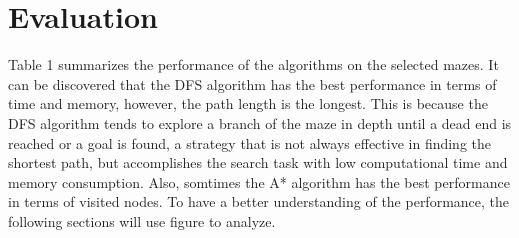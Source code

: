 \documentclass{article}
\begin{document}
\section{Evaluation}
Table 1 summarizes the performance of the algorithms on the selected mazes. 
It can be discovered that the DFS algorithm has the best performance in terms of time and memory, however, the path length is the longest. 
This is because the DFS algorithm tends to explore a branch of the maze in depth until a dead end is reached or a goal is found, a strategy that is not always effective in finding the shortest path, but accomplishes the search task with low computational time and memory consumption.
Also, somtimes the A* algorithm has the best performance in terms of visited nodes. To have a better understanding of the performance, the following sections will use figure to analyze.
\end{document}
